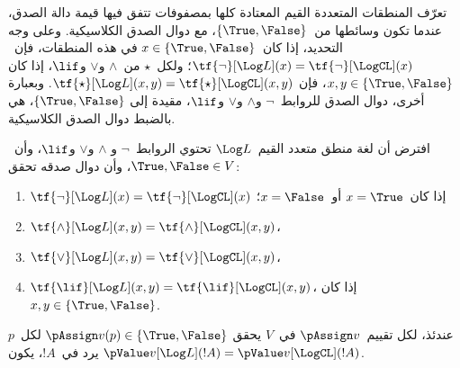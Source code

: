 \documentclass[../../../include/open-logic-section]{subfiles}
\begin{document}


تعرّف المنطقات المتعددة القيم المعتادة كلها بمصفوفات تتفق فيها قيمة
دالة الصدق، عندما تكون وسائطها من~$\{\True, \False\}$، مع دوال الصدق
الكلاسيكية. وعلى وجه التحديد، إذا كان~$x \in \{\True, \False\}$ في
هذه المنطقات، فإن~$\tf{\lnot}[\Log L](x) = \tf{\lnot}[\LogCL](x)$؛
ولكل~$\star$ من~$\land$ و$\lor$ و$\lif$، إذا كان
$x, y \in \{\True, \False\}$، فإن
$\tf{\star}[\Log L](x,y) = \tf{\star}[\LogCL](x,y)$. وبعبارة أخرى،
دوال الصدق للروابط~$\lnot$ و$\land$ و$\lor$ و$\lif$، مقيدة إلى
$\{\True,\False\}$، هي بالضبط دوال الصدق الكلاسيكية.

\begin{prop}
  افترض أن لغة منطق متعدد القيم~$\Log L$ تحتوي الروابط~$\lnot$ و
  $\land$ و$\lor$ و$\lif$، وأن~$\True, \False \in V$، وأن دوال صدقه
  تحقق:
  \begin{enumerate}
    \item{} $\tf{\lnot}[\Log L](x) = \tf{\lnot}[\LogCL](x)$ إذا كان~$x =
    \True$ أو~$x = \False$؛
    \item{} $\tf{\land}[\Log L](x,y) = \tf{\land}[\LogCL](x,y)$،
    \item{} $\tf{\lor}[\Log L](x,y) = \tf{\lor}[\LogCL](x,y)$،
    \item{} $\tf{\lif}[\Log L](x,y) = \tf{\lif}[\LogCL](x,y)$،
    إذا كان~$x, y \in \{\True, \False\}$.
  \end{enumerate}
  عندئذ، لكل تقييم~$\pAssign v$ في~$V$ يحقق
  $\pAssign v(p) \in \{\True,\False\}$ لكل~$p$ يرد في~$!A$، يكون
  $\pValue v[\Log L](!A) = \pValue v[\LogCL](!A)$.
\end{prop}
\end{document}
